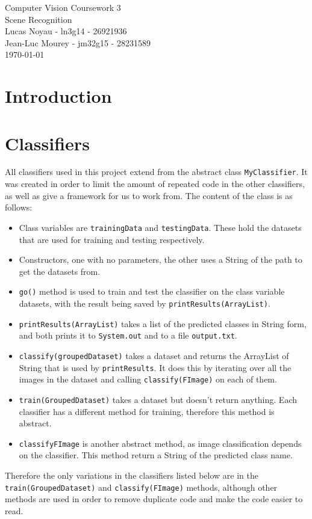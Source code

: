 \documentclass[a4paper,12pt]{article}
\begin{document}
\begin{center}
{\Large Computer Vision Coursework 3} \\
{\Large Scene Recognition} \\
Lucas Noyau - ln3g14 - 26921936\\
Jean-Luc Mourey - jm32g15 - 28231589\\
\today
\end{center}


\section{Introduction}

\section{Classifiers}
All classifiers used in this project extend from the abstract class \texttt{MyClassifier}. It was created in order to limit the amount of repeated code in the other classifiers, as well as give a framework for us to work from. The content of the class is as follows:
\begin{itemize}
	\item Class variables are \texttt{trainingData} and \texttt{testingData}. These hold the datasets that are used for training and testing respectively.
	\item Constructors, one with no parameters, the other uses a String of the path to get the datasets from.
	\item \texttt{go()} method is used to train and test the classifier on the class variable datasets, with the result being saved by \texttt{printResults(ArrayList)}.
	\item \texttt{printResults(ArrayList)} takes a list of the predicted classes in String form, and both prints it to \texttt{System.out} and to a file \texttt{output.txt}.
	\item \texttt{classify(groupedDataset)} takes a dataset and returns the ArrayList of String that is used by \texttt{printResults}. It does this by iterating over all the images in the dataset and calling \texttt{classify(FImage)} on each of them.
	\item \texttt{train(GroupedDataset)} takes a dataset but doesn't return anything. Each classifier has a different method for training, therefore this method is abstract.
	\item \texttt{classify{FImage}} is another abstract method, as image classification depends on the classifier. This method return a String of the predicted class name.
\end{itemize}
Therefore the only variations in the classifiers listed below are in the \texttt{train(GroupedDataset)} and \texttt{classify(FImage)} methods, although other methods are used in order to remove duplicate code and make the code easier to read.
\end{document}
